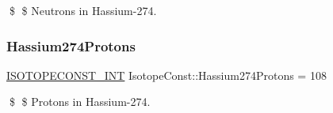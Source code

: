\$ \$ Neutrons in Hassium-\/274. \mbox{\label{group___isotope_const-_hassium-_hs274_gada69ea7bc3c43709c0e83f89816ae8be}} 
\subsubsection{\texorpdfstring{Hassium274\+Protons}{Hassium274Protons}}
{\footnotesize\ttfamily \mbox{\hyperlink{group___isotope_const-_macros_ga5f18360b3e99483a35c32d789e62621c}{I\+S\+O\+T\+O\+P\+E\+C\+O\+N\+S\+T\+\_\+\+I\+NT}} Isotope\+Const\+::\+Hassium274\+Protons = 108}

\$ \$ Protons in Hassium-\/274. 